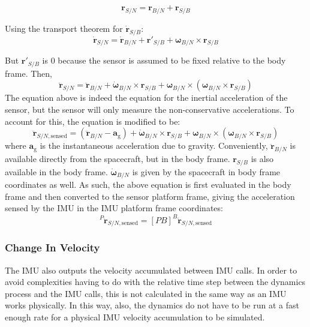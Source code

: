 \begin{equation}
\bm{r}_{S/N} = \bm{r}_{B/N} + \bm{r}_{S/B}
\end{equation}

Using the transport theorem for $\dot{\bm{r}}_{S/B}$:
\begin{equation}
	\dot{\bm{r}}_{S/N} = \dot{\bm{r}}_{B/N} + \bm{r}'_{S/B} + \bm{\omega}_{B/N} \times \bm{r}_{S/B}
	\label{eq:rDot}
\end{equation}

But $\bm{r}'_{S/B}$ is $0$ because the sensor is assumed to be fixed relative to the body frame. Then,
\begin{equation}
\ddot{\bm{r}}_{S/N} = \ddot{\bm{r}}_{B/N} + \dot{\bm{\omega}}_{B/N} \times \bm{r}_{S/B} +  \bm{\omega}_{B/N} \times (\bm{\omega}_{B/N} \times \bm{r}_{S/B})
\end{equation}
The equation above is indeed the equation for the inertial acceleration of the sensor, but the sensor will only measure the non-conservative accelerations. To account for this, the equation is modified to be:
\begin{equation}
\ddot{\bm{r}}_{S/N, \textrm{sensed}} = (\ddot{\bm{r}}_{B/N} - \bm{a}_\textrm{g}) + \dot{\bm{\omega}}_{B/N} \times \bm{r}_{S/B} +  \bm{\omega}_{B/N} \times (\bm{\omega}_{B/N} \times \bm{r}_{S/B})
\end{equation}
where $\bm{a}_\textrm{g}$ is the instantaneous acceleration due to gravity. Conveniently, $\ddot{\bm{r}}_{B/N}$ is available directly from the spacecraft, but in the body frame. $\bm{r}_{S/B}$ is also available in the body frame. $\dot{\bm{\omega}}_{B/N}$ is given by the spacecraft in body frame coordinates as well. As such, the above equation is first evaluated in the body frame and then converted to the sensor platform frame, giving the acceleration sensed by the IMU in the IMU platform frame coordinates:
\begin{equation}
	^P\ddot{\bm{r}}_{S/N, \textrm{sensed}} = [PB] ^B \ddot{\bm{r}}_{S/N, \textrm{sensed}}
\end{equation}

\subsubsection{Change In Velocity}
The IMU also outputs the velocity accumulated between IMU calls. In order to avoid complexities having to do with the relative time step between the dynamics process and the IMU calls, this is not calculated in the same way as an IMU works physically. In this way, also, the dynamics do not have to be run at a fast enough rate for a physical IMU velocity accumulation to be simulated.

